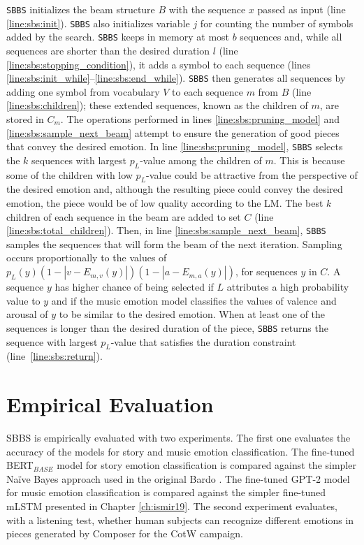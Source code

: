 \texttt{SBBS} initializes the beam structure $B$ with the sequence $x$ passed as input (line \ref{line:sbs:init}).
\texttt{SBBS} also initializes variable $j$ for counting the number of symbols added by the search. \texttt{SBBS} keeps in memory at most $b$ sequences and, while all sequences are shorter than the desired duration $l$ (line \ref{line:sbs:stopping_condition}), it adds a symbol to each sequence (lines \ref{line:sbs:init_while}--\ref{line:sbs:end_while}). \texttt{SBBS} then generates all sequences by adding one symbol from vocabulary $V$ to each sequence $m$ from $B$ (line \ref{line:sbs:children}); these extended sequences, known as the children of $m$, are stored in $C_m$. The operations performed in lines \ref{line:sbs:pruning_model} and \ref{line:sbs:sample_next_beam} attempt to ensure the generation of good pieces that convey the desired emotion. In line \ref{line:sbs:pruning_model}, \texttt{SBBS} selects the $k$ sequences with largest $p_L$-value among the children of $m$. This is because some of the children with low $p_L$-value could be attractive from the perspective of the desired emotion and, although the resulting piece could convey the desired emotion, the piece would be of low quality according to the LM. The best $k$ children of each sequence in the beam are added to set $C$ (line \ref{line:sbs:total_children}). Then, in line \ref{line:sbs:sample_next_beam}, \texttt{SBBS} samples the sequences that will form the beam of the next iteration. Sampling occurs proportionally to the values of $p_L(y) (1 - |v - E_{m,v}(y)|) (1 - |a - E_{m,a}(y)|)$, for sequences $y$ in $C$. A sequence $y$ has higher chance of being selected if $L$ attributes a high probability value to $y$ and if the music emotion model classifies the values of valence and arousal of $y$ to be similar to the desired emotion. When at least one of the sequences is longer than the desired duration of the piece, \texttt{SBBS} returns the sequence with largest $p_L$-value that satisfies the duration constraint (line~\ref{line:sbs:return}).

\section{Empirical Evaluation}

SBBS is empirically evaluated with two experiments. The first one evaluates the accuracy of the models for story and music emotion classification. The fine-tuned BERT$_{BASE}$ model for story emotion classification is compared against the simpler Na\"ive Bayes approach used in the original Bardo \cite{padovani2017}. The fine-tuned GPT-2 model for music emotion classification is compared against the simpler fine-tuned mLSTM presented in Chapter \ref{ch:ismir19}. The second experiment evaluates, with a listening test, whether human subjects can recognize different emotions in pieces generated by Composer for the CotW campaign.

